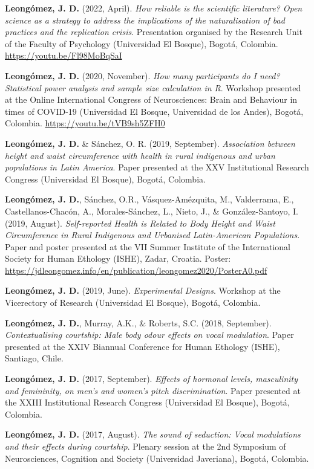 \documentclass[11pt,a4paper,]{awesome-cv}
\begin{document}
\textbf{Leongómez, J. D.} (2022, April). \emph{How reliable is the
scientific literature? Open science as a strategy to address the
implications of the naturalisation of bad practices and the replication
crisis}. Presentation organised by the Research Unit of the Faculty of
Psychology (Universidad El Bosque), Bogotá, Colombia.
\url{https://youtu.be/Fl98MoBqSaI}

\textbf{Leongómez, J. D.} (2020, November). \emph{How many participants
do I need? Statistical power analysis and sample size calculation in R}.
Workshop presented at the Online International Congress of
Neurosciences: Brain and Behaviour in times of COVID-19 (Universidad El
Bosque, Universidad de los Andes), Bogotá, Colombia.
\url{https://youtu.be/tVB9sh5ZFH0}

\textbf{Leongómez, J. D.} \& Sánchez, O. R. (2019, September).
\emph{Association between height and waist circumference with health in
rural indigenous and urban populations in Latin America}. Paper
presented at the XXV Institutional Research Congress (Universidad El
Bosque), Bogotá, Colombia.

\textbf{Leongómez, J. D.}, Sánchez, O.R., Vásquez-Amézquita, M.,
Valderrama, E., Castellanos-Chacón, A., Morales-Sánchez, L., Nieto, J.,
\& González-Santoyo, I. (2019, August). \emph{Self-reported Health is
Related to Body Height and Waist Circumference in Rural Indigenous and
Urbanised Latin-American Populations}. Paper and poster presented at the
VII Summer Institute of the International Society for Human Ethology
(ISHE), Zadar, Croatia. Poster:
\url{https://jdleongomez.info/en/publication/leongomez2020/PosterA0.pdf}

\textbf{Leongómez, J. D.} (2019, June). \emph{Experimental Designs}.
Workshop at the Vicerectory of Research (Universidad El Bosque), Bogotá,
Colombia.

\textbf{Leongómez, J. D.}, Murray, A.K., \& Roberts, S.C. (2018,
September). \emph{Contextualising courtship: Male body odour effects on
vocal modulation}. Paper presented at the XXIV Biannual Conference for
Human Ethology (ISHE), Santiago, Chile.

\textbf{Leongómez, J. D.} (2017, September). \emph{Effects of hormonal
levels, masculinity and femininity, on men's and women's pitch
discrimination}. Paper presented at the XXIII Institutional Research
Congress (Universidad El Bosque), Bogotá, Colombia.

\textbf{Leongómez, J. D.} (2017, August). \emph{The sound of seduction:
Vocal modulations and their effects during courtship}. Plenary session
at the 2nd Symposium of Neurosciences, Cognition and Society
(Universidad Javeriana), Bogotá, Colombia.
\end{document}
